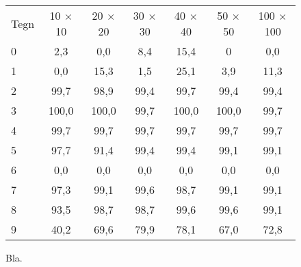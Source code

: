 \begin{figure}[htp]
\centering
\begin{tabular}{|l|c|c|c|c|c|c|}\hline
\rowcolor[gray]{0.9} \multicolumn{7}{|>{\columncolor[gray]{0.9}}c|}{\textbf{Forenings-billeder}} \\ \hline
Tegn & 10 $\times$ 10 & 20 $\times$ 20 & 30 $\times$ 30 & 40 $\times$ 40 & 50 $\times$ 50 & 100 $\times$ 100\\\hline
0 & 2,3 & 0,0 & 8,4 & 15,4 & 0 & 0,0\\\hline
1 & 0,0 & 15,3 & 1,5 & 25,1 & 3,9 & 11,3\\\hline
2 & 99,7 & 98,9 & 99,4 & 99,7 & 99,4 & 99,4\\\hline
3 & 100,0 & 100,0 & 99,7 & 100,0 & 100,0 & 99,7\\\hline
4 & 99,7 & 99,7 & 99,7 & 99,7 & 99,7 & 99,7\\\hline
5 & 97,7 & 91,4 & 99,4 & 99,4 & 99,1 & 99,1\\\hline
6 & 0,0 & 0,0 & 0,0 & 0,0 & 0,0 & 0,0\\\hline
7 & 97,3 & 99,1 & 99,6 & 98,7 & 99,1 & 99,1\\\hline
8 & 93,5 & 98,7 & 98,7 & 99,6 & 99,6 & 99,1\\\hline
9 & 40,2 & 69,6 & 79,9 & 78,1 & 67,0 & 72,8\\\hline
\end{tabular}
\caption{Bla.}
\label{fig:test:and_tal}
\end{figure}

